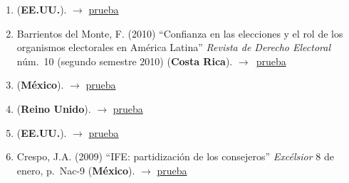 \documentclass[12 pt, letter]{article}
\newenvironment{CitasMiTrabajo}{
    \begin{footnotesize}
    \begin{enumerate}[label={\footnotesize\emph{cita~\arabic*}},ref=\arabic*] %
        \setlength{\itemsep}{.1\itemsep}
        \setlength{\parskip}{.1\parskip}
    }{\end{enumerate}\end{footnotesize}}
\begin{document}

        \begin{CitasMiTrabajo}

        \item {} (\textbf{EE.UU.}).  $\rightarrow$ \href{https://github.com/emagar/cv/blob/master/citasMiTrab/estevezEtalElecStud/arevalo2015.pdf}{prueba}

        \item Barrientos del Monte, F. (2010) ``Confianza en las elecciones y el rol de los organismos electorales en Am\'erica Latina'' \emph{Revista de Derecho Electoral} n\'um.\ 10 (segundo semestre 2010) (\textbf{Costa Rica}). $\rightarrow$~\href{https://github.com/emagar/cv/blob/master/citasMiTrab/estevezEtalElecStud/Barrientos.pdf}{prueba}

        \item {} (\textbf{M\'exico}).  $\rightarrow$ \href{https://github.com/emagar/cv/blob/master/citasMiTrab/estevezEtalElecStud/barrientos2011.pdf}{prueba}

        \item {} (\textbf{Reino Unido}).  $\rightarrow$ \href{https://github.com/emagar/cv/blob/master/citasMiTrab/estevezEtalElecStud/birch2011.pdf}{prueba}

        \item {} (\textbf{EE.UU.}).  $\rightarrow$ \href{https://github.com/emagar/cv/blob/master/citasMiTrab/estevezEtalElecStud/bumin2009phd.pdf}{prueba}

        \item Crespo, J.A. (2009)
        ``IFE: partidizaci\'on de los consejeros''
        \emph{Exc\'elsior} 8 de enero, p.\ Nac-9 (\textbf{M\'exico}). $\rightarrow$ \href{https://github.com/emagar/cv/blob/master/citasMiTrab/estevezEtalElecStud/crespo.pdf}{prueba}


\end{CitasMiTrabajo}
\end{document}
